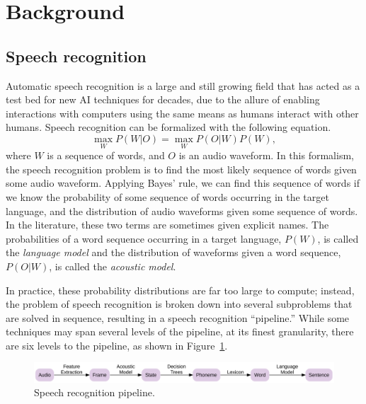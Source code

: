 \documentclass{article}
\begin{document}
\section{Background}
\label{sec:background}

\subsection{Speech recognition}
\label{subsec:recognition}

Automatic speech recognition
is a large and still growing field
that has acted as a test bed
for new AI techniques for decades,
due to the allure of enabling
interactions with computers
using the same means
as humans interact with other humans.
Speech recognition can be formalized
with the following equation.
\begin{equation}
  \max_W P(W|O) = \max_W P(O|W) P(W),
\end{equation}
where $W$ is a sequence of words,
and $O$ is an audio waveform.
In this formalism, the speech recognition problem
is to find the most likely sequence of words
given some audio waveform.
Applying Bayes' rule, we can find
this sequence of words
if we know the probability
of some sequence of words occurring
in the target language,
and the distribution of audio waveforms
given some sequence of words.
In the literature, these two terms
are sometimes given explicit names.
The probabilities of a word sequence
occurring in a target language,
$P(W)$, is called the \textit{language model}
and the distribution of waveforms
given a word sequence, $P(O|W)$,
is called the \textit{acoustic model}.

In practice, these probability distributions
are far too large to compute;
instead, the problem of speech recognition
is broken down into several subproblems
that are solved in sequence,
resulting in a speech recognition ``pipeline.''
While some techniques may span several levels
of the pipeline, at its finest granularity,
there are six levels to the pipeline,
as shown in Figure~\ref{fig:recognition}.

\begin{figure}
  \begin{center}
    \includegraphics[width=1.0\linewidth]{recognition}
  \end{center}
  \caption{Speech recognition pipeline.}
  \label{fig:recognition}
\end{figure}
\end{document}
